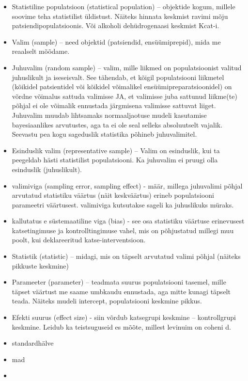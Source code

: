 \documentclass[]{book}
\begin{document}
\begin{itemize}
\item
  Statistiline populatsioon (statistical population) -- objektide kogum,
  millele soovime teha statistilist üldistust. Näiteks hinnata keskmist
  ravimi mõju patsiendipopulatsioonis. Või alkoholi dehüdrogenaasi
  keskmist Kcat-i.
\item
  Valim (sample) -- need objektid (patsiendid, ensüümiprepid), mida me
  reaalselt mõõdame.
\item
  Juhuvalim (random sample) -- valim, mille liikmed on populatsioonist
  valitud juhuslikult ja iseseisvalt. See tähendab, et kõigil
  populatsiooni liikmetel (kõikidel patsientidel või kõikidel võimalikel
  ensüümipreparatsioonidel) on võrdne võimalus sattuda valimisse JA, et
  valimisse juba sattunud liikme(te) põhjal ei ole võimalik ennustada
  järgmisena valimisse sattuvat liiget. Juhuvalim muudab lihtsamaks
  normaaljaotuse mudeli kasutamise bayesiaanlikes arvutustes, aga ta ei
  ole seal selleks absoluutselt vajalik. Seevastu pea kogu sageduslik
  statistika põhineb juhuvalimitel.
\item
  Esinduslik valim (representative sample) -- Valim on esinduslik, kui
  ta peegeldab hästi statistilist populatsiooni. Ka juhuvalim ei pruugi
  olla esinduslik (juhuslikult).
\item
  valimiviga (sampling error, sampling effect) - määr, millega
  juhuvalimi põhjal arvutatud statistiku väärtus (näit keskväärtus)
  erineb populatsiooni parameetri väärtusest. valimiviga kutsutakse
  sageli ka juhuslikuks müraks.
\item
  kallutatus e süstemaatiline viga (bias) - see osa statistiku väärtuse
  erinevusest katsetingimuse ja kontrolltingimuse vahel, mis on
  põhjustatud millegi muu poolt, kui deklareeritud katse-interventsioon.
\item
  Statistik (statistic) -- midagi, mis on täpselt arvutatud valimi
  põhjal (näiteks pikkuste keskmine)
\item
  Parameeter (parameter) -- teadmata suurus populatsiooni tasemel, mille
  täpset väärtust me saame umbkaudu ennustada, aga mitte kunagi täpselt
  teada. Näiteks mudeli intercept, populatsiooni keskmine pikkus.
\item
  Efekti suurus (effect size) - siin võrdub katsegrupi keskmine --
  kontrollgrupi keskmine. Leidub ka teistsuguseid es mõõte, millest
  levinuim on coheni d.
\item
  standardhälve
\item
  mad
\item

\end{itemize}
\end{document}
